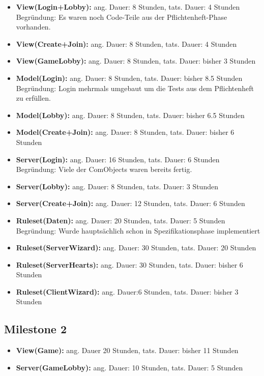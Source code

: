 \documentclass{article}
\begin{document}
\begin{itemize}
\item \textbf{View(Login+Lobby):} ang. Dauer: 8 Stunden, tats. Dauer: 4 Stunden \\
Begründung: Es waren noch Code-Teile aus der Pflichtenheft-Phase vorhanden. \\
\item \textbf{View(Create+Join):} ang. Dauer: 8 Stunden, tats. Dauer: 4 Stunden \\
\item \textbf{View(GameLobby):} ang. Dauer: 8 Stunden, tats. Dauer: bisher 3 Stunden \\
\item \textbf{Model(Login):} ang. Dauer: 8 Stunden, tats. Dauer: bisher 8.5 Stunden \\
Begründung: Login mehrmals umgebaut um die Tests aus dem Pflichtenheft zu erfüllen. \\
\item \textbf{Model(Lobby):} ang. Dauer: 8 Stunden, tats. Dauer: bisher 6.5 Stunden \\
\item \textbf{Model(Create+Join):} ang. Dauer: 8 Stunden, tats. Dauer: bisher 6 Stunden \\
\item \textbf{Server(Login):} ang. Dauer: 16 Stunden, tats. Dauer: 6 Stunden \\
Begründung: Viele der ComObjects waren bereits fertig.
\item \textbf{Server(Lobby):} ang. Dauer: 8 Stunden, tats. Dauer: 3 Stunden 
\item \textbf{Server(Create+Join):} ang. Dauer: 12 Stunden, tats. Dauer: 6 Stunden 
\item \textbf{Ruleset(Daten):} ang. Dauer: 20 Stunden, tats. Dauer: 5 Stunden
Begründung: Wurde hauptsächlich schon in Spezifikationsphase implementiert

\item \textbf{Ruleset(ServerWizard):} ang. Dauer: 30 Stunden, tats. Dauer: 20 Stunden

\item \textbf{Ruleset(ServerHearts):} ang. Dauer: 30 Stunden, tats. Dauer: bisher 6 Stunden
\item \textbf{Ruleset(ClientWizard):} ang. Dauer:6 Stunden, tats. 
Dauer: bisher 3 Stunden
\end{itemize}

\subsection{Milestone 2}
\begin{itemize}
\item \textbf{View(Game):} ang. Dauer 20 Stunden, tats. Dauer: bisher 11 Stunden
\item \textbf{Server(GameLobby):} ang. Dauer: 10 Stunden, tats. Dauer: 5 Stunden 
\end{itemize}
\end{document}
